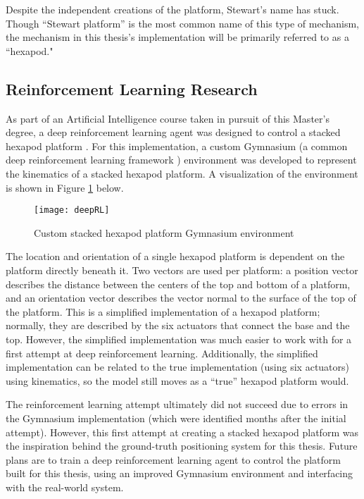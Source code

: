 \documentclass[11pt]{ucthesisCP}
\begin{document}
Despite the independent creations of the platform, Stewart’s name has stuck. Though “Stewart platform” is the most common name of this type of mechanism, the mechanism in this thesis’s implementation will be primarily referred to as a “hexapod."

\subsection{Reinforcement Learning Research} \label{ssec:2s1s2}
As part of an Artificial Intelligence course taken in pursuit of this Master’s degree, a deep reinforcement learning agent was designed to control a stacked hexapod platform \cite{cscpaper}. For this implementation, a custom Gymnasium (a common deep reinforcement learning framework \cite{gymnasium}) environment was developed to represent the kinematics of a stacked hexapod platform. A visualization of the environment is shown in Figure \ref{fig:deepRL} below.

\begin{figure}[htbp]
	\centering
	\texttt{[image: deepRL]}
	\caption{Custom stacked hexapod platform Gymnasium environment \cite{cscpaper}}
	\label{fig:deepRL}
\end{figure}

The location and orientation of a single hexapod platform is dependent on the platform directly beneath it. Two vectors are used per platform: a position vector describes the distance between the centers of the top and bottom of a platform, and an orientation vector describes the vector normal to the surface of the top of the platform. This is a simplified implementation of a hexapod platform; normally, they are described by the six actuators that connect the base and the top. However, the simplified implementation was much easier to work with for a first attempt at deep reinforcement learning. Additionally, the simplified implementation can be related to the true implementation (using six actuators) using kinematics, so the model still moves as a “true” hexapod platform would.

The reinforcement learning attempt ultimately did not succeed due to errors in the Gymnasium implementation (which were identified months after the initial attempt). However, this first attempt at creating a stacked hexapod platform was the inspiration behind the ground-truth positioning system for this thesis. Future plans are to train a deep reinforcement learning agent to control the platform built for this thesis, using an improved Gymnasium environment and interfacing with the real-world system.
\end{document}
